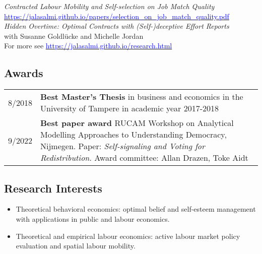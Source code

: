 \documentclass[16pt]{article}
\begin{document}
\noindent \textit{Contracted Labour Mobility and Self-selection on Job Match Quality} \\ \href{https://jalasalmi.github.io/papers/selection\_on\_job\_match\_quality.pdf}{\textcolor{blue}{https://jalasalmi.github.io/papers/selection\_on\_job\_match\_quality.pdf}} \\

\noindent \textit{Hidden Overtime: Optimal Contracts with (Self-)deceptive Effort Reports} \\
with Susanne Goldlücke and Michelle Jordan \\



\noindent For more see \href{https://jalasalmi.github.io/research.html}{\textcolor{blue}{https://jalasalmi.github.io/research.html}}

\subsection*{Awards} 
\begin{tabular}{@{}p{1.5in}p{5in}}
8/2018           & \textbf{Best Master's Thesis} in business and economics in the University of Tampere in academic year 2017-2018 \\
9/2022           & \textbf{Best paper award} RUCAM Workshop on Analytical Modelling Approaches to Understanding Democracy, Nijmegen. Paper: \textit{Self-signaling and Voting for Redistribution}. Award committee: Allan Drazen, Toke Aidt
\end{tabular}

\subsection*{Research Interests}

\begin{itemize} \setlength\itemsep{0.01em}
   \item Theoretical behavioral economics: optimal belief and self-esteem management with applications in public and labour economics.
   \item Theoretical and empirical labour economics: active labour market policy evaluation and spatial labour mobility.
\end{itemize}
\end{document}
